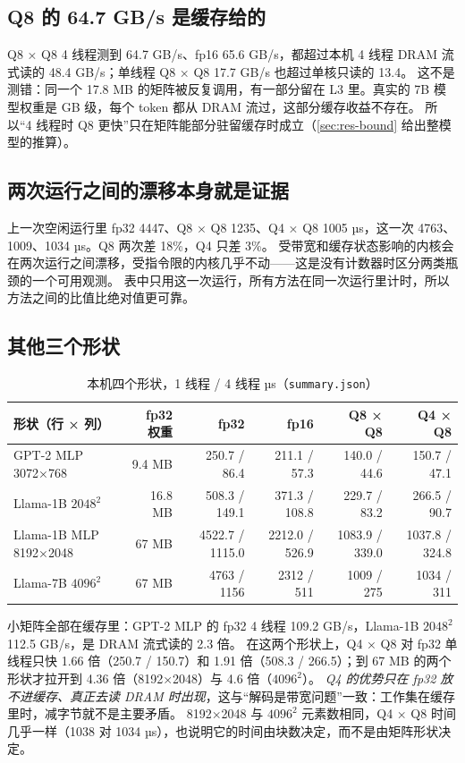 \documentclass[11pt,a4paper]{ctexart}
\begin{document}
\subsection{Q8 的 64.7 GB/s 是缓存给的}

Q8 × Q8 4 线程测到 64.7 GB/s、fp16 65.6 GB/s，都超过本机 4 线程 DRAM 流式读的 48.4 GB/s；单线程 Q8 × Q8 17.7 GB/s 也超过单核只读的 13.4。
这不是测错：同一个 17.8 MB 的矩阵被反复调用，有一部分留在 L3 里。真实的 7B 模型权重是 GB 级，每个 token 都从 DRAM 流过，这部分缓存收益不存在。
所以“4 线程时 Q8 更快”只在矩阵能部分驻留缓存时成立（\cref{sec:res-bound} 给出整模型的推算）。

\subsection{两次运行之间的漂移本身就是证据}

上一次空闲运行里 fp32 4447、Q8 × Q8 1235、Q4 × Q8 1005 µs，这一次 4763、1009、1034 µs。Q8 两次差 18\%，Q4 只差 3\%。
受带宽和缓存状态影响的内核会在两次运行之间漂移，受指令限的内核几乎不动——这是没有计数器时区分两类瓶颈的一个可用观测。
表中只用这一次运行，所有方法在同一次运行里计时，所以方法之间的比值比绝对值更可靠。

\subsection{其他三个形状}

\begin{table}[H]
\centering\small
\caption{本机四个形状，1 线程 / 4 线程 µs（\texttt{summary.json}）}\label{tab:shapes-local}
\begin{tabular}{lrrrrr}
\toprule
形状（行 × 列） & fp32 权重 & fp32 & fp16 & Q8 × Q8 & Q4 × Q8 \\
\midrule
GPT-2 MLP 3072×768 & 9.4 MB & 250.7 / 86.4 & 211.1 / 57.3 & 140.0 / 44.6 & 150.7 / 47.1 \\
Llama-1B $2048^2$ & 16.8 MB & 508.3 / 149.1 & 371.3 / 108.8 & 229.7 / 83.2 & 266.5 / 90.7 \\
Llama-1B MLP 8192×2048 & 67 MB & 4522.7 / 1115.0 & 2212.0 / 526.9 & 1083.9 / 339.0 & 1037.8 / 324.8 \\
Llama-7B $4096^2$ & 67 MB & 4763 / 1156 & 2312 / 511 & 1009 / 275 & 1034 / 311 \\
\bottomrule
\end{tabular}
\end{table}

小矩阵全部在缓存里：GPT-2 MLP 的 fp32 4 线程 109.2 GB/s，Llama-1B $2048^2$ 112.5 GB/s，是 DRAM 流式读的 2.3 倍。
在这两个形状上，Q4 × Q8 对 fp32 单线程只快 1.66 倍（250.7 / 150.7）和 1.91 倍（508.3 / 266.5）；到 67 MB 的两个形状才拉开到 4.36 倍（8192×2048）与 4.6 倍（$4096^2$）。
\emph{Q4 的优势只在 fp32 放不进缓存、真正去读 DRAM 时出现}，这与“解码是带宽问题”一致：工作集在缓存里时，减字节就不是主要矛盾。
8192×2048 与 $4096^2$ 元素数相同，Q4 × Q8 时间几乎一样（1038 对 1034 µs），也说明它的时间由块数决定，而不是由矩阵形状决定。
\end{document}
